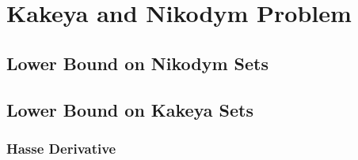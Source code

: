 \section{Kakeya and Nikodym Problem}
\subsection{Lower Bound on Nikodym Sets}
\subsection{Lower Bound on Kakeya Sets}
\subsubsection{Hasse Derivative}